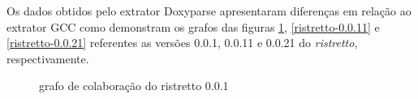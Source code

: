 Os dados obtidos pelo extrator Doxyparse apresentaram diferenças em relação ao
extrator GCC como demonstram os grafos das figuras \ref{ristretto-0.0.1},
\ref{ristretto-0.0.11} e \ref{ristretto-0.0.21} referentes as versões 0.0.1,
0.0.11 e 0.0.21 do {\it ristretto}, respectivamente.

\begin{figure}
\center
{}
\qquad
{}
\caption{grafo de colaboração do ristretto 0.0.1}
\label{ristretto-0.0.1}
\end{figure}

